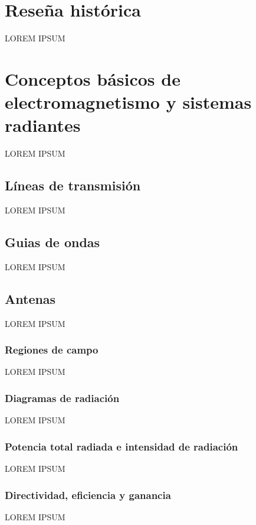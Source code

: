 

\section{Reseña histórica}
\label{sec_intro_resenia}

LOREM IPSUM

\section{Conceptos básicos de electromagnetismo y sistemas radiantes}
\label{sec_intro_conceptos_basicos}
LOREM IPSUM
\subsection{Líneas de transmisión}
\label{subsec_lineas_de_transmision}
LOREM IPSUM
\subsection{Guias de ondas}
\label{subsec_guias_de_ondas}
LOREM IPSUM
\subsection{Antenas}
\label{subsec_antenas}
LOREM IPSUM
\subsubsection{Regiones de campo}
\label{subsubsec_regiones_de_campo}
LOREM IPSUM
\subsubsection{Diagramas de radiación}
\label{subsubsec_diag_de_rad}
LOREM IPSUM
\subsubsection{Potencia total radiada e intensidad de radiación}
\label{subsubsec_pot_total_radiada}
LOREM IPSUM
\subsubsection{Directividad, eficiencia y ganancia}
\label{subsubsec_directividad}
LOREM IPSUM
